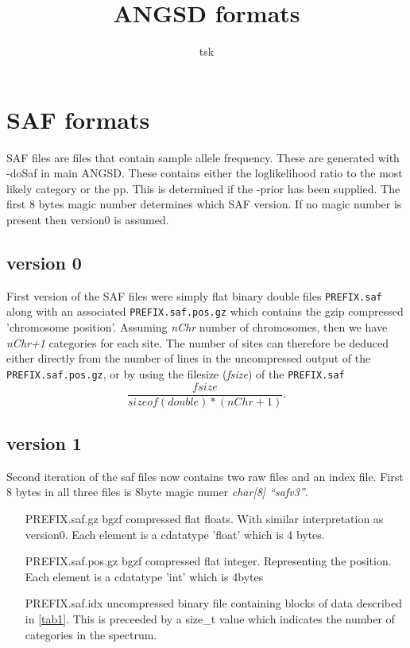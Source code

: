 \documentclass[10pt]{article}
\begin{document}
\title{ANGSD formats}
\author{tsk}
\maketitle
\vspace*{1em}


\section{SAF formats}
SAF files are files that contain sample allele frequency. These are generated with -doSaf in main ANGSD. These contains either the loglikelihood ratio to the most likely category or the pp. This is determined if the -prior has been supplied.
The first 8 bytes magic number determines which SAF version. If no magic number is present then version0 is assumed.
\subsection{version 0}
First version of the SAF files were simply flat binary double files \texttt{PREFIX.saf} along with an associated \texttt{PREFIX.saf.pos.gz} which contains the gzip compressed 'chromosome position'. Assuming \emph{nChr} number of chromosomes, then we have \emph{nChr+1} categories for each site. The number of sites can therefore be deduced either directly from the number of lines in the uncompressed output of the \texttt{PREFIX.saf.pos.gz}, or by using the filesize (\emph{fsize}) of the \texttt{PREFIX.saf} $$\frac{fsize}{sizeof(double)*(nChr+1)}.$$
\subsection{version 1}

Second iteration of the saf files now contains two raw files and an index file. First 8 bytes in all three files is 8byte magic numer \emph{char[8] ``safv3''}. 
\begin{itemize}
\item[PREFIX.saf.gz] bgzf compressed flat floats. With similar interpretation as version0. Each element is a cdatatype 'float' which is 4 bytes.
\item[PREFIX.saf.pos.gz] bgzf compressed flat integer. Representing the position. Each element is a cdatatype 'int' which is 4bytes
\item[PREFIX.saf.idx] uncompressed binary file containing blocks of data described in \ref{tab1}. This is preceeded by a size\_t value which indicates the number of categories in the spectrum.
\end{itemize}
\end{document}
